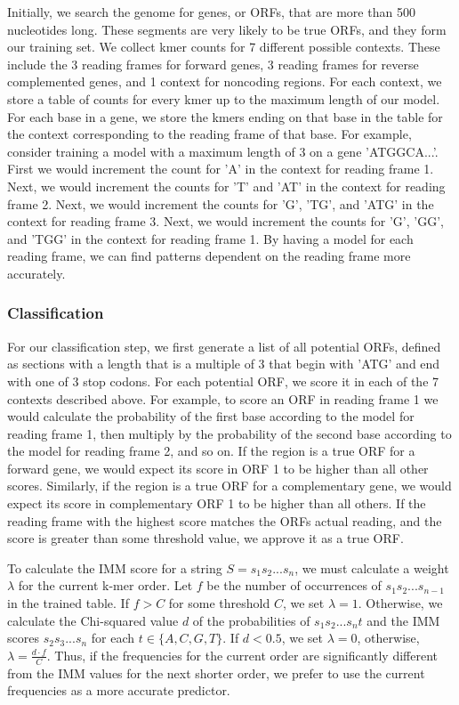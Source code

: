 \documentclass[11pt,letterpaper]{article}
\begin{document}
Initially, we search the genome for genes, or ORFs, that are more than 500 nucleotides long. These segments are very likely to be true ORFs, and they form our training set. We collect kmer counts for 7 different possible contexts. These include the 3 reading frames for forward genes, 3 reading frames for reverse complemented genes, and 1 context for noncoding regions. For each context, we store a table of counts for every kmer up to the maximum length of our model. For each base in a gene, we store the kmers ending on that base in the table for the context corresponding to the reading frame of that base. For example, consider training a model with a maximum length of 3 on a gene 'ATGGCA...'. First we would increment the count for 'A' in the context for reading frame 1. Next, we would increment the counts for 'T' and 'AT' in the context for reading frame 2. Next, we would increment the counts for 'G', 'TG', and 'ATG' in the context for reading frame 3. Next, we would increment the counts for 'G', 'GG', and 'TGG' in the context for reading frame 1. By having a model for each reading frame, we can find patterns dependent on the reading frame more accurately.

\subsubsection{Classification}
For our classification step, we first generate a list of all potential ORFs, defined as sections with a length that is a multiple of 3 that begin with 'ATG' and end with one of 3 stop codons. For each potential ORF, we score it in each of the 7 contexts described above. For example, to score an ORF in reading frame 1 we would calculate the probability of the first base according to the model for reading frame 1, then multiply by the probability of the second base according to the model for reading frame 2, and so on. If the region is a true ORF for a forward gene, we would expect its score in ORF 1 to be higher than all other scores. Similarly, if the region is a true ORF for a complementary gene, we would expect its score in complementary ORF 1 to be higher than all others. If the reading frame with the highest score matches the ORFs actual reading, and the score is greater than some threshold value, we approve it as a true ORF.

To calculate the IMM score for a string $S=s_1s_2...s_n$, we must calculate a weight $\lambda$ for the current k-mer order. Let $f$ be the number of occurrences of $s_1s_2...s_{n-1}$ in the trained table. If $f>C$ for some threshold $C$, we set $\lambda=1$. Otherwise, we calculate the Chi-squared value $d$ of the probabilities of $s_1s_2...s_nt$ and the IMM scores $s_2s_3...s_n$ for each $t\in \{A,C,G,T\}$. If $d < 0.5$, we set $\lambda=0$, otherwise, $\lambda=\frac{d\cdot f}{C}$. Thus, if the frequencies for the current order are significantly different from the IMM values for the next shorter order, we prefer to use the current frequencies as a more accurate predictor.
\end{document}
